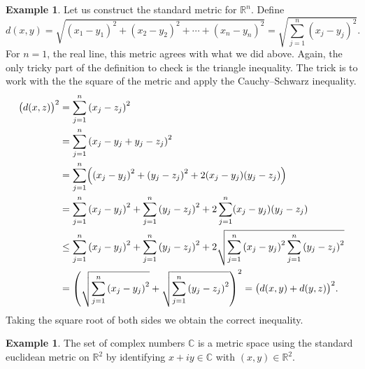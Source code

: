 \documentclass[12pt,openany]{book}
\newcommand{\C}{{\mathbb{C}}}
\newcommand{\R}{{\mathbb{R}}}
\theoremstyle{plain}
\theoremstyle{remark}
\theoremstyle{definition}
\theoremstyle{exercise}
\theoremstyle{example}
\newtheorem{example}[thm]{Example}
\begin{document}
\begin{example}
Let us construct the
standard metric\index{standard metric on $\R^n$} for $\R^n$.  Define
\begin{equation*}
d(x,y) =
\sqrt{
{(x_1-y_1)}^2 + 
{(x_2-y_2)}^2 + 
\cdots +
{(x_n-y_n)}^2
} =
\sqrt{
\sum_{j=1}^n
{(x_j-y_j)}^2 
} .
\end{equation*}
For $n=1$, the real line, this metric agrees with what we did above.  Again,
the only tricky part of the definition to check is the triangle inequality.
The trick is to work with the
 the square of the metric and apply
the Cauchy--Schwarz inequality.
\begin{equation*}
\begin{split}
{\bigl(d(x,z)\bigr)}^2 & =
\sum_{j=1}^n
{(x_j-z_j)}^2 
\\
& =
\sum_{j=1}^n
{(x_j-y_j+y_j-z_j)}^2 
\\
& =
\sum_{j=1}^n
\Bigl(
{(x_j-y_j)}^2+{(y_j-z_j)}^2 + 2(x_j-y_j)(y_j-z_j)
\Bigr)
\\
& =
\sum_{j=1}^n
{(x_j-y_j)}^2
+
\sum_{j=1}^n
{(y_j-z_j)}^2 
+
2
\sum_{j=1}^n
(x_j-y_j)(y_j-z_j)
\\
& \leq
\sum_{j=1}^n
{(x_j-y_j)}^2
+
\sum_{j=1}^n
{(y_j-z_j)}^2 
+
2
\sqrt{
\sum_{j=1}^n
{(x_j-y_j)}^2
\sum_{j=1}^n
{(y_j-z_j)}^2
}
\\
& =
{\left(
\sqrt{
\sum_{j=1}^n
{(x_j-y_j)}^2
}
+
\sqrt{
\sum_{j=1}^n
{(y_j-z_j)}^2 
}
\right)}^2
=
{\bigl( d(x,y) + d(y,z) \bigr)}^2 .
\end{split}
\end{equation*}
Taking the square root of both sides we obtain the correct inequality.
\end{example}

\begin{example} \label{example:mscomplex}
The set of complex numbers $\C$ is a metric space using the standard
euclidean metric on $\R^2$
by identifying $x+iy \in \C$ with $(x,y) \in \R^2$.
\end{example}
\end{document}
